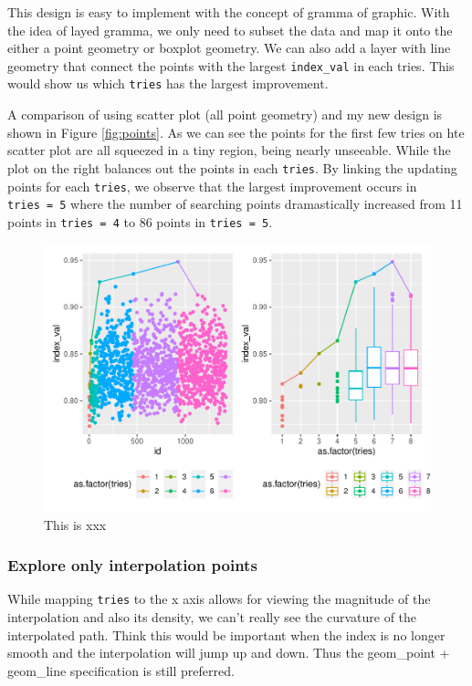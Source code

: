 \documentclass[12pt]{article}
\begin{document}
This design is easy to implement with the concept of gramma of graphic.
With the idea of layed gramma, we only need to subset the data and map
it onto the either a point geometry or boxplot geometry. We can also add
a layer with line geometry that connect the points with the largest
\texttt{index\_val} in each tries. This would show us which
\texttt{tries} has the largest improvement.

A comparison of using scatter plot (all point geometry) and my new
design is shown in Figure \ref{fig:points}. As we can see the points for
the first few tries on hte scatter plot are all squeezed in a tiny
region, being nearly unseeable. While the plot on the right balances out
the points in each \texttt{tries}. By linking the updating points for
each \texttt{tries}, we observe that the largest improvement occurs in
\texttt{tries\ =\ 5} where the number of searching points dramastically
increased from 11 points in \texttt{tries\ =\ 4} to 86 points in
\texttt{tries\ =\ 5}.

\begin{figure}
\centering
\includegraphics{paper_files/figure-latex/points-1.pdf}
\caption{\label{points} This is xxx}
\end{figure}

\hypertarget{explore-only-interpolation-points}{%
\subsubsection{Explore only interpolation
points}\label{explore-only-interpolation-points}}

While mapping \texttt{tries} to the x axis allows for viewing the
magnitude of the interpolation and also its density, we can't really see
the curvature of the interpolated path. Think this would be important
when the index is no longer smooth and the interpolation will jump up
and down. Thus the geom\_point + geom\_line specification is still
preferred.
\end{document}
